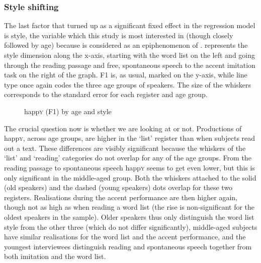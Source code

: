 \subsubsection{Style shifting}
\label{sec.prod.res.vow.happy.f1.shifting}

The last factor that turned up as a significant fixed effect in the regression model is style, the variable which this study is most interested in (though closely followed by age) because  is considered as an epiphenomenon of .
 represents the style dimension along the x-axis, starting with the word list on the left and going through the reading passage and free, spontaneous speech to the accent imitation task on the right of the graph.
F1 is, as usual, marked on the y-axis, while line type once again codes the three age groups of speakers.
The size of the whiskers corresponds to the standard error for each register and age group.

\begin{figure}
	
		\resizebox{0.5\linewidth}{!}{} 
	\caption{happ\textsc{y} (F1) by age and style}
	\label{fig.line.f1w.happy.tot}
\end{figure}

The crucial question now is whether we are looking at  or not.
Productions of happ\textsc{y}, across age groups, are higher in the `list' register than when subjects read out a text.
These differences are visibly significant because the whiskers of the `list' and `reading' categories do not overlap for any of the age groups.
From the reading passage to spontaneous speech happ\textsc{y} seems to get even lower, but this is only significant in the middle-aged group.
Both the whiskers attached to the solid (old speakers) and the dashed (young speakers) dots overlap for these two registers.
Realisations during the accent performance are then higher again, though not as high as when reading a word list (the rise is non-significant for the oldest speakers in the sample).
Older speakers thus only distinguish the word list style from the other three (which do not differ significantly), middle-aged subjects have similar realisations for the word list and the accent performance, and the youngest interviewees distinguish reading and spontaneous speech together from both imitation and the word list.

